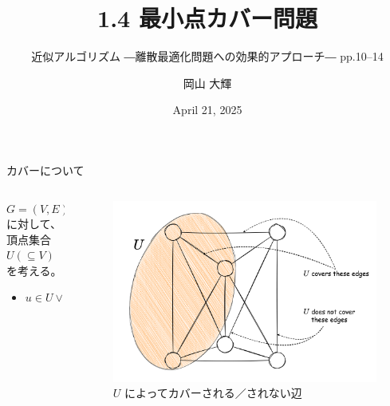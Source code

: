 \documentclass[aspectratio=169]{beamer}
\title{1.4 最小点カバー問題}
\subtitle{近似アルゴリズム ―離散最適化問題への効果的アプローチ― pp.10--14}
\author{岡山 大輝}
\institute{兵庫県立大学大学院 情報科学研究科\textit{(ad25r010@guh.u-hyogo.ac.jp)}}
\date{April 21, 2025}
\begin{document}
\begin{frame}
	\titlepage{}
\end{frame}

\begin{frame}{カバーについて}
	\begin{columns}
		\begin{column}{0.4\textwidth}
			\(G = (V, E)\) に対して、\\
			\alert{頂点}集合 \(U (\subseteq V)\) を考える。
			\newline

			\begin{itemize}
				\item \(u \in U \lor v \in U\)
			\end{itemize}

		\end{column}
		\begin{column}{0.6\textwidth}
			\begin{figure}
				\centering
				\includegraphics[width=1.0\textwidth]{figures/cover.png}
				\caption{\(U\) によってカバーされる／されない辺}
			\end{figure}
		\end{column}
	\end{columns}
\end{frame}
\end{document}

